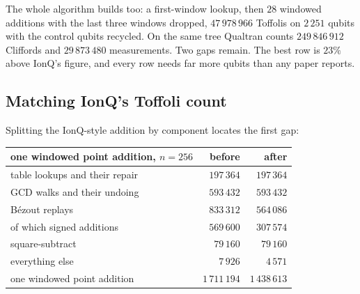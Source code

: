 \documentclass[11pt]{article}
\theoremstyle{plain}
\theoremstyle{remark}
\begin{document}
The whole algorithm builds too: a first-window lookup, then $28$ windowed additions
with the last three windows dropped, $47\,978\,966$ Toffolis on $2\,251$ qubits with the
control qubits recycled. On the same tree Qualtran counts $249\,846\,912$ Cliffords and
$29\,873\,480$ measurements. Two gaps remain. The best row is $23\%$ above IonQ's
figure, and every row needs far more qubits than any paper reports.

\subsection{Matching IonQ's Toffoli count}\label{ec:sec:toffgap}

Splitting the IonQ-style addition by component locates the first gap:

\begin{center}\small
\begin{tabular}{lrr}
\toprule
one windowed point addition, $n=256$ & before & after\\
\midrule
table lookups and their repair & $197\,364$ & $197\,364$\\
GCD walks and their undoing & $593\,432$ & $593\,432$\\
B\'ezout replays & $833\,312$ & $564\,086$\\
\quad of which signed additions & $569\,600$ & $307\,574$\\
square-subtract & $79\,160$ & $79\,160$\\
everything else & $7\,926$ & $4\,571$\\
\midrule
one windowed point addition & $1\,711\,194$ & $1\,438\,613$\\
\bottomrule
\end{tabular}
\end{center}
\end{document}
